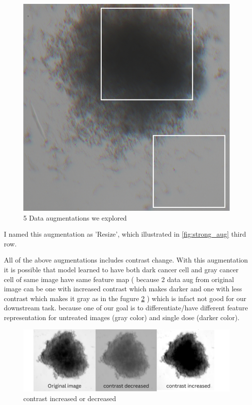 \begin{figure}[H]
  \centering
  \includegraphics[scale=0.6]{figures/expo.png} 
  \caption{5 Data augmentations we explored}
  \label{fig:expo}
\end{figure}

I named this augmentation as 'Resize', which illustrated in \ref{fig:strong_aug} third row.


All of the above augmentations includes contrast change. With this augmentation it is possible that model learned to have both dark cancer cell and gray cancer
cell of same image have same feature map ( because 2 data aug from original image can be one with increased contrast which makes darker and one with less contrast 
which makes it gray as in the fugure \ref{fig:ohne} ) which is infact not good for our downstream task. because one of our goal is to differentiate/have different feature representation
for  untreated images (gray color) and single dose (darker color). 

\begin{figure}[H]
  \centering
  \includegraphics[scale=0.4]{figures/ohne.png} 
  \caption{contrast increased or decreased}
  \label{fig:ohne}
\end{figure}

